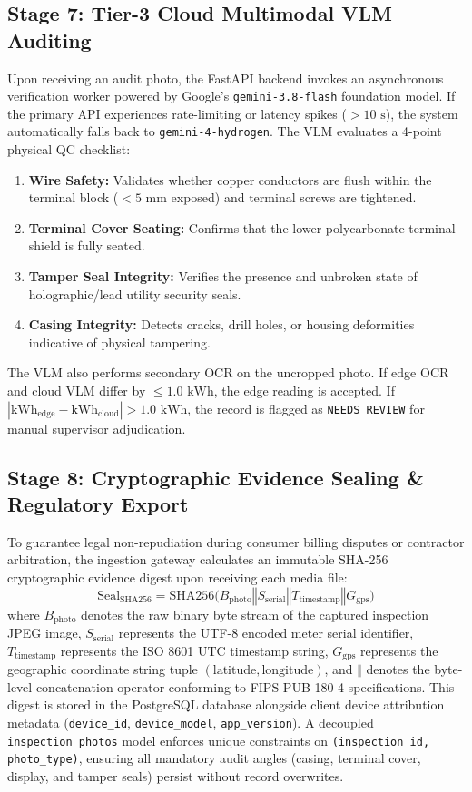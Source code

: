 \documentclass[12pt,a4paper,oneside]{report}
\begin{document}
\subsection{Stage 7: Tier-3 Cloud Multimodal VLM Auditing}
Upon receiving an audit photo, the FastAPI backend invokes an asynchronous verification worker powered by Google's \texttt{gemini-3.8-flash} foundation model. If the primary API experiences rate-limiting or latency spikes ($>10\text{~s}$), the system automatically falls back to \texttt{gemini-4-hydrogen}. The VLM evaluates a 4-point physical QC checklist:
\begin{enumerate}
    \item \textbf{Wire Safety:} Validates whether copper conductors are flush within the terminal block ($<5\text{~mm}$ exposed) and terminal screws are tightened.
    \item \textbf{Terminal Cover Seating:} Confirms that the lower polycarbonate terminal shield is fully seated.
    \item \textbf{Tamper Seal Integrity:} Verifies the presence and unbroken state of holographic/lead utility security seals.
    \item \textbf{Casing Integrity:} Detects cracks, drill holes, or housing deformities indicative of physical tampering.
\end{enumerate}
The VLM also performs secondary OCR on the uncropped photo. If edge OCR and cloud VLM differ by $\le 1.0\text{~kWh}$, the edge reading is accepted. If $| \text{kWh}_{\text{edge}} - \text{kWh}_{\text{cloud}} | > 1.0\text{~kWh}$, the record is flagged as \texttt{NEEDS\_REVIEW} for manual supervisor adjudication.

\subsection{Stage 8: Cryptographic Evidence Sealing \& Regulatory Export}
To guarantee legal non-repudiation during consumer billing disputes or contractor arbitration, the ingestion gateway calculates an immutable SHA-256 cryptographic evidence digest upon receiving each media file:
\begin{equation}
\text{Seal}_{\text{SHA256}} = \text{SHA256}\Big(B_{\text{photo}} \mathbin{\Vert} S_{\text{serial}} \mathbin{\Vert} T_{\text{timestamp}} \mathbin{\Vert} G_{\text{gps}}\Big)
\end{equation}
where $B_{\text{photo}}$ denotes the raw binary byte stream of the captured inspection JPEG image, $S_{\text{serial}}$ represents the UTF-8 encoded meter serial identifier, $T_{\text{timestamp}}$ represents the ISO 8601 UTC timestamp string, $G_{\text{gps}}$ represents the geographic coordinate string tuple $(\text{latitude}, \text{longitude})$, and $\mathbin{\Vert}$ denotes the byte-level concatenation operator conforming to FIPS PUB 180-4 specifications. This digest is stored in the PostgreSQL database alongside client device attribution metadata (\texttt{device\_id}, \texttt{device\_model}, \texttt{app\_version}). A decoupled \texttt{inspection\_photos} model enforces unique constraints on \texttt{(inspection\_id, photo\_type)}, ensuring all mandatory audit angles (casing, terminal cover, display, and tamper seals) persist without record overwrites.
\end{document}
